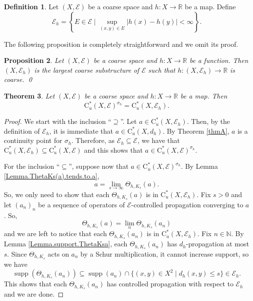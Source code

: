 \documentclass[11pt]{amsart}
\newcommand{\R}{\mathbb{R}}
\newcommand{\N}{\mathbb{N}}
\newcommand{\cE}{\mathcal{E}}
\newcommand{\cstu}{\mathrm{C}^*_u}
\numberwithin{equation}{section}
\newtheorem{theorem}{Theorem}[section]
\newtheorem{proposition}[theorem]{Proposition}
\theoremstyle{definition}
\newtheorem{definition}[theorem]{Definition}
\theoremstyle{remark}
\DeclareMathOperator{\supp}{supp}
\begin{document}
\begin{definition}\label{Definition.Eh.largest.coarse.substructure}
Let $(X,\cE)$ be a coarse space and $h\colon X\to \R$ be a map. Define 
\[\cE_h=\left\{E\in \cE\mid \sup_{(x,y)\in E}|h(x)-h(y)|<\infty\right\}.\]
\end{definition}
The following proposition is   completely  straightforward and  we omit its proof.

 \begin{proposition}\label{PropLargestCoarseStrucWithhCoarse}
      Let $(X,\cE)$  be  a coarse space and $h\colon X\to\R$ be a function. Then $(X,\cE_h)$ is the largest  coarse substructure of $\cE$ such that $h\colon (X,\cE_h)\to \R$ is coarse. \qed
 \end{proposition}







\begin{theorem}\label{Thm.uRa.h.Points.Cont.Substructure}
    Let $(X,\cE)$ be a  coarse space and $h\colon X\to \R$ be a map. Then
    \[\cstu(X,\cE)^{\sigma_h}=\cstu(X,\cE_h).\]
\end{theorem}

\begin{proof}
    We start with the inclusion ``$\supseteq$''. Let $a\in \cstu(X,\cE_{h})$. Then, by the definition of $\cE_h$, it is immediate that  $a\in \cstu(X,d_h)$. By Theorem \ref{thmA}, $a$ is a continuity point for $\sigma_{h}$. Therefore,   as  $\cE_h\subseteq \cE$, we have that $\cstu(X,\cE_h)\subseteq \cstu(X,\cE)$ and  this shows that     $a\in\cstu(X,\cE)^{\sigma_h} $.

For the inclusion ``$\subseteq$'', suppose now that $a\in \cstu(X,\cE)^{\sigma_h}$. By  Lemma \ref{Lemma.ThetaKs(a).tends.to.a},
\[a=\lim_{s\to \infty}\Theta_{h,K_s}(a).\]
So, we only need to show that each $\Theta_{h,K_s}(a)$ is in $ \cstu(X,\cE_h)$. Fix $s>0$ and let  $(a_n)_n$ be a sequence of operators of $\cE$-controlled propagation converging to $a$. So,
\[\Theta_{h,K_s}(a)=\lim_n\Theta_{h,K_s}(a_n)\]
and we are left to notice that each $\Theta_{h,K_s}(a_n)$ is in $\cstu(X,\cE_h)$.   Fix $n\in\N$. By Lemma \ref{Lemma.support.ThetaKsa}, each $\Theta_{h,K_s}(a_n)$ has $d_h$-propagation at most $s$. Since $\Theta_{h,K_s}$ acts on $a_n$ by a Schur multiplication, it cannot increase support, so  we have
\[\supp\left(\Theta_{h,K_s}(a_n)\right)\subseteq \supp(a_n)\cap \{(x,y)\in X^2\mid d_h(x,y)\leq s\}\in \cE_h.\]
This shows that each $\Theta_{h,K_s}(a_n)$ has controlled propagation with respect to $\cE_h$ and we are done.
\end{proof}
\end{document}
